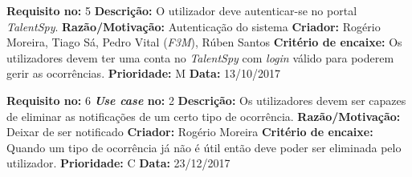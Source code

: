 \newpage
\begin{framed}
\noindent\textbf{Requisito no:} 5
\vspace{2mm}
\newline\textbf{Descrição:} O utilizador deve autenticar-se no portal \emph{TalentSpy}.
\vspace{1mm}
\newline\textbf{Razão/Motivação:} Autenticação do sistema
\vspace{1mm}
\newline\textbf{Criador:} Rogério Moreira, Tiago Sá, Pedro Vital (\emph{F3M}), Rúben Santos
\vspace{1mm}
\newline\textbf{Critério de encaixe:} Os utilizadores devem ter uma conta no \emph{TalentSpy} com \emph{login} válido para poderem gerir as ocorrências.
\vspace{1mm}
\newline\textbf{Prioridade:} M
\vspace{1mm}
\newline\textbf{Data:} 13/10/2017
\end{framed}

\begin{framed}
\noindent\textbf{Requisito no:} 6
\qquad
\textbf{\emph{Use case} no:} 2
\vspace{2mm}
\newline\textbf{Descrição:} Os utilizadores devem ser capazes de eliminar as notificações de um certo tipo de ocorrência.
\vspace{1mm}
\newline\textbf{Razão/Motivação:} Deixar de ser notificado
\vspace{1mm}
\newline\textbf{Criador:} Rogério Moreira
\vspace{1mm}
\newline\textbf{Critério de encaixe:} Quando um tipo de ocorrência já não é útil então deve poder ser eliminada pelo utilizador.
\vspace{1mm}
\newline\textbf{Prioridade:} C
\vspace{1mm}
\newline\textbf{Data:} 23/12/2017
\end{framed}

\newpage

